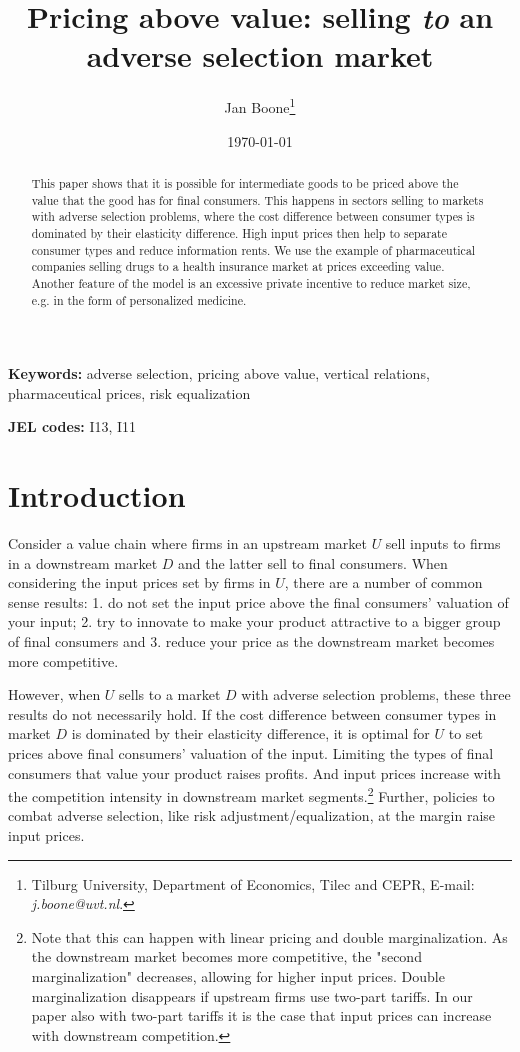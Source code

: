 \documentclass[12pt,english,a4paper]{article}
\author{Jan Boone\thanks{Tilburg University, Department of Economics, Tilec and CEPR, E-mail: \textit{j.boone@uvt.nl}.}}
\date{\today}
\title{Pricing above value: selling \emph{to} an adverse selection market}
\begin{document}
\maketitle
\begin{PREFACE}
\maketitle
\end{PREFACE}

\begin{abstract}
This paper shows that it is possible for intermediate goods to be priced above the value that the good has for final consumers. This happens in sectors selling to markets with adverse selection problems, where the cost difference between consumer types is dominated by their elasticity difference. High input prices then help to separate consumer types and reduce information rents. We use the example of pharmaceutical companies selling drugs to a health insurance market at prices exceeding value. Another feature of the model is an excessive private incentive to reduce market size, e.g. in the form of personalized medicine.
\end{abstract}

\textbf{Keywords:} adverse selection, pricing above value, vertical relations, pharmaceutical prices, risk equalization

\textbf{JEL codes:} I13, I11


\newpage

\section{Introduction}
\label{sec:org330bd98}

Consider a value chain where firms in an upstream market \(U\) sell inputs to firms in a downstream market \(D\) and the latter sell to final consumers. When considering the input prices set by firms in \(U\), there are a number of common sense results: 1. do not set the input price above the final consumers' valuation of your input; 2. try to innovate to make your product attractive to a bigger group of final consumers and 3. reduce your price as the downstream market becomes more competitive.

However, when \(U\) sells to a market \(D\) with adverse selection problems, these three results do not necessarily hold. If the cost difference between consumer types in market \(D\) is dominated by their elasticity difference, it is optimal for \(U\) to set prices above final consumers' valuation of the input. Limiting the types of final consumers that value your product raises profits. And input prices increase with the competition intensity in downstream market segments.\footnote{Note that this can happen with linear pricing and double marginalization. As the downstream market becomes more competitive, the "second marginalization" decreases, allowing for higher input prices. Double marginalization disappears if upstream firms use two-part tariffs. In our paper also with two-part tariffs it is the case that input prices can increase with downstream competition.} Further, policies to combat adverse selection, like risk adjustment/equalization, at the margin raise input prices.
\end{document}
